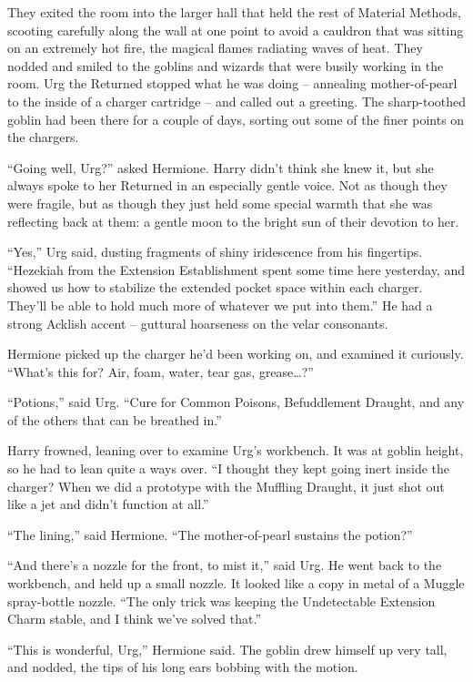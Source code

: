 They exited the room into the larger hall that held the rest of Material
Methods, scooting carefully along the wall at one point to avoid a
cauldron that was sitting on an extremely hot fire, the magical flames
radiating waves of heat. They nodded and smiled to the goblins and
wizards that were busily working in the room. Urg the Returned stopped
what he was doing -- annealing mother-of-pearl to the inside of a
charger cartridge -- and called out a greeting. The sharp-toothed goblin
had been there for a couple of days, sorting out some of the finer
points on the chargers.

``Going well, Urg?'' asked Hermione. Harry didn't think she knew it, but
she always spoke to her Returned in an especially gentle voice. Not as
though they were fragile, but as though they just held some special
warmth that she was reflecting back at them: a gentle moon to the bright
sun of their devotion to her.

``Yes,'' Urg said, dusting fragments of shiny iridescence from his
fingertips. ``Hezekiah from the Extension Establishment spent some time
here yesterday, and showed us how to stabilize the extended pocket space
within each charger. They'll be able to hold much more of whatever we
put into them.'' He had a strong Acklish accent -- guttural hoarseness
on the velar consonants.

Hermione picked up the charger he'd been working on, and examined it
curiously. ``What's this for? Air, foam, water, tear gas,
grease\ldots?''

``Potions,'' said Urg. ``Cure for Common Poisons, Befuddlement Draught,
and any of the others that can be breathed in.''

Harry frowned, leaning over to examine Urg's workbench. It was at goblin
height, so he had to lean quite a ways over. ``I thought they kept going
inert inside the charger? When we did a prototype with the Muffling
Draught, it just shot out like a jet and didn't function at all.''

``The lining,'' said Hermione. ``The mother-of-pearl sustains the
potion?''

``And there's a nozzle for the front, to mist it,'' said Urg. He went
back to the workbench, and held up a small nozzle. It looked like a copy
in metal of a Muggle spray-bottle nozzle. ``The only trick was keeping
the Undetectable Extension Charm stable, and I think we've solved
that.''

``This is wonderful, Urg,'' Hermione said. The goblin drew himself up
very tall, and nodded, the tips of his long ears bobbing with the
motion.

